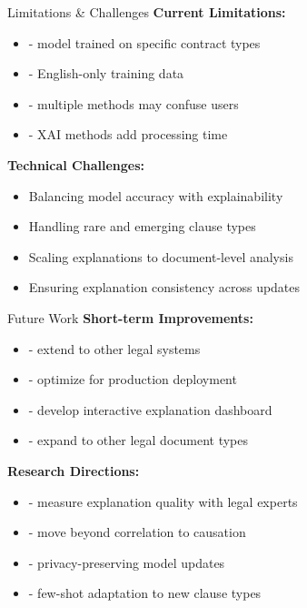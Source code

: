 \begin{frame}{Limitations \& Challenges}
\textbf{Current Limitations:}
\begin{itemize}
    \item {} - model trained on specific contract types
    \item {} - English-only training data
    \item {} - multiple methods may confuse users
    \item {} - XAI methods add processing time
\end{itemize}

\vspace{0.5cm}
\textbf{Technical Challenges:}
\begin{itemize}
    \item Balancing model accuracy with explainability
    \item Handling rare and emerging clause types
    \item Scaling explanations to document-level analysis
    \item Ensuring explanation consistency across updates
\end{itemize}
\end{frame}

\begin{frame}{Future Work}
\textbf{Short-term Improvements:}
\begin{itemize}
    \item {} - extend to other legal systems
    \item {} - optimize for production deployment
    \item {} - develop interactive explanation dashboard
    \item {} - expand to other legal document types
\end{itemize}

\vspace{0.5cm}
\textbf{Research Directions:}
\begin{itemize}
    \item {} - measure explanation quality with legal experts
    \item {} - move beyond correlation to causation
    \item {} - privacy-preserving model updates
    \item {} - few-shot adaptation to new clause types
\end{itemize}
\end{frame}

